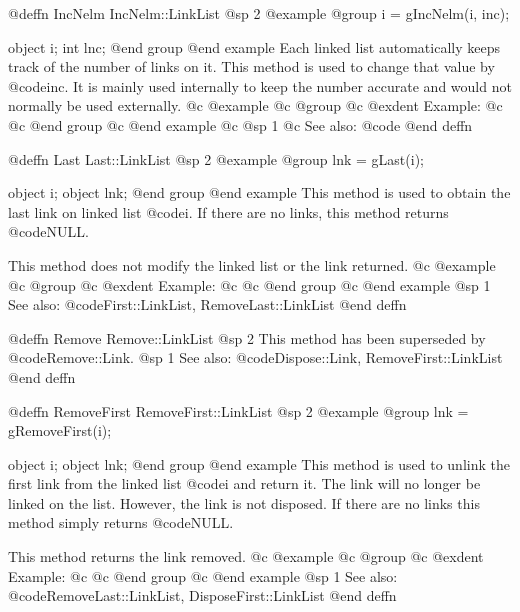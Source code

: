 @deffn {IncNelm} IncNelm::LinkList
@sp 2
@example
@group
i = gIncNelm(i, inc);

object  i;
int     lnc;
@end group
@end example
Each linked list automatically keeps track of the number of links on it.
This method is used to change that value by @code{inc}.  It is mainly
used internally to keep the number accurate and would not normally be
used externally.
@c @example
@c @group
@c @exdent Example:
@c 
@c @end group
@c @end example
@c @sp 1
@c See also:  @code{}
@end deffn















@deffn {Last} Last::LinkList
@sp 2
@example
@group
lnk = gLast(i);

object  i;
object  lnk;
@end group
@end example
This method is used to obtain the last link on linked list @code{i}.
If there are no links, this method returns @code{NULL}.

This method does not modify the linked list or the link returned.
@c @example
@c @group
@c @exdent Example:
@c 
@c @end group
@c @end example
@sp 1
See also:  @code{First::LinkList, RemoveLast::LinkList}
@end deffn













@deffn {Remove} Remove::LinkList
@sp 2
This method has been superseded by @code{Remove::Link}.
@sp 1
See also:  @code{Dispose::Link, RemoveFirst::LinkList}
@end deffn








@deffn {RemoveFirst} RemoveFirst::LinkList
@sp 2
@example
@group
lnk = gRemoveFirst(i);

object  i;
object  lnk;
@end group
@end example
This method is used to unlink the first link from the linked list
@code{i} and return it.  The link will no longer be linked on the list.
However, the link is not disposed.  If there are no links this method
simply returns @code{NULL}.

This method returns the link removed.
@c @example
@c @group
@c @exdent Example:
@c 
@c @end group
@c @end example
@sp 1
See also:  @code{RemoveLast::LinkList, DisposeFirst::LinkList}
@end deffn











